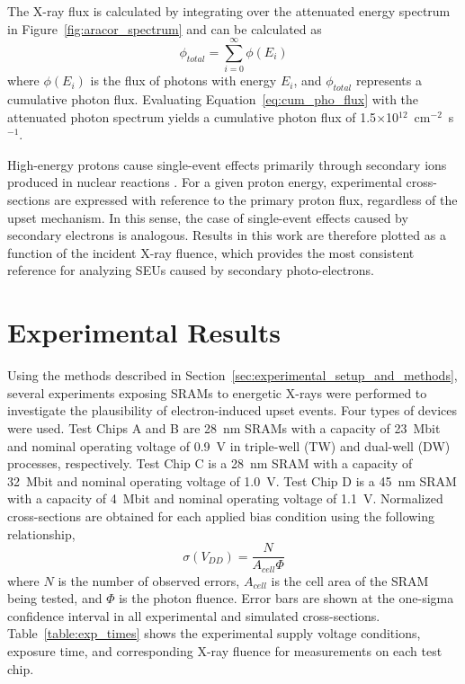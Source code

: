 The X-ray flux is calculated by integrating over the attenuated energy spectrum in Figure~\ref{fig:aracor_spectrum} and can be calculated as
\begin{equation}
    \label{eq:cum_pho_flux}
    \phi_{total} = \sum_{i=0}^{\infty} \phi(E_{i})
\end{equation}
where $\phi(E_{i})$ is the flux of photons with energy $E_{i}$, and $\phi_{total}$ represents a cumulative photon flux. 
Evaluating Equation~\ref{eq:cum_pho_flux} with the attenuated photon spectrum yields a cumulative photon flux of 1.5$\times$10$^{12}$~cm$^{-2}$~s$^{-1}$.

High-energy protons cause single-event effects primarily through secondary ions produced in nuclear reactions \cite{Heidel:2006tp,Heidel:2008vf,Heidel:2009vx,Rodbell:2007vl}. 
For a given proton energy, experimental cross-sections are expressed with reference to the primary proton flux, regardless of the upset mechanism. 
In this sense, the case of single-event effects caused by secondary electrons is analogous. 
Results in this work are therefore plotted as a function of the incident X-ray fluence, which provides the most consistent reference for analyzing SEUs caused by secondary photo-electrons.

\section{Experimental Results} %
\label{sec:experimental_results}
Using the methods described in Section~\ref{sec:experimental_setup_and_methods}, several experiments exposing SRAMs to energetic X-rays were performed to investigate the plausibility of electron-induced upset events. 
Four types of devices were used. 
Test Chips A and B are 28~nm SRAMs with a capacity of 23~Mbit and nominal operating voltage of 0.9~V in triple-well (TW) and dual-well (DW) processes, respectively. 
Test Chip C is a 28~nm SRAM with a capacity of 32~Mbit and nominal operating voltage of 1.0~V. 
Test Chip D is a 45~nm SRAM with a capacity of 4~Mbit and nominal operating voltage of 1.1~V. 
Normalized cross-sections are obtained for each applied bias condition using the following relationship,
\begin{equation}
    \label{eq:norm_cs}
    \sigma(V_{DD}) = \frac{N}{A_{cell} \Phi}
\end{equation}
where $N$ is the number of observed errors, $A_{cell}$ is the cell area of the SRAM being tested, and $\Phi$ is the photon fluence. 
Error bars are shown at the one-sigma confidence interval in all experimental and simulated cross-sections.
Table~\ref{table:exp_times} shows the experimental supply voltage conditions, exposure time, and corresponding X-ray fluence for measurements on each test chip.

